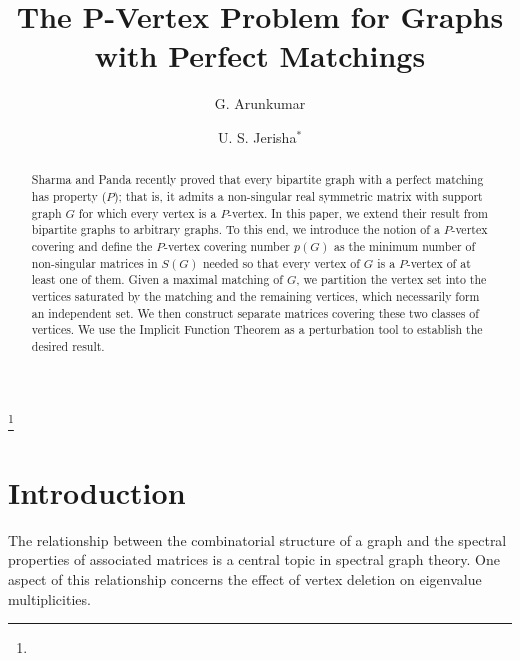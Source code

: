 \documentclass[12pt,reqno]{amsart}
\theoremstyle{plain}
\theoremstyle{definition}
\theoremstyle{block}
\theoremstyle{remark}
\numberwithin{equation}{section}
\begin{document}
\title{The P-Vertex Problem for Graphs with Perfect Matchings}

   \author{G. Arunkumar}
	
	\address{Indian Institute of Technology Madras, Chennai, India.}

    
    
	\author{U. S. Jerisha$^{\ast}$}
   \thanks{}
	\address{Indian Institute of Technology Madras, Chennai, India.}


\begin{abstract}
Sharma and Panda recently proved that every bipartite graph with a perfect matching has property ($P$); that is, it admits a non-singular real symmetric matrix with support graph $G$ for which every vertex is a $P$-vertex. In this paper, we extend their result from bipartite graphs to arbitrary graphs. To this end, we introduce the notion of a $P$-vertex covering and define the $P$-vertex covering number $p(G)$ as the minimum number of non-singular matrices in $S(G)$ needed so that every vertex of $G$ is a $P$-vertex of at least one of them. Given a maximal matching of $G$, we partition the vertex set into the vertices saturated by the matching and the remaining vertices, which necessarily form an independent set. We then construct separate matrices covering these two classes of vertices. We use the Implicit Function Theorem as a perturbation tool to establish the desired result.



\end{abstract}

\maketitle

\medskip


\section{Introduction}

The relationship between the combinatorial structure of a graph and the
spectral properties of associated matrices is a central topic in spectral
graph theory. One aspect of this relationship concerns the effect of
vertex deletion on eigenvalue multiplicities.
\end{document}
